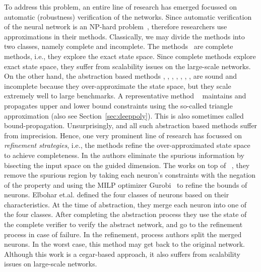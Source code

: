 To address this problem, an entire line of research has emerged focussed on automatic (robustness) verification of the networks. Since automatic verification of the neural network is an NP-hard problem~\cite{?}, therefore researchers use approximations in their methods. Classically, we may divide the methods into two classes, namely complete and incomplete. The methods~\cite{lomuscio2017approach,fischetti2018deep,dutta2018output,cheng2017maximum,katz2017reluplex,katz2019marabou,ehlers2017formal,huang2017safety,wang2021beta,xu2020fast,zhang2022general} are complete methods, i.e., they explore the exact state space. Since complete methods explore exact state space, they suffer from scalability issues on the large-scale networks. On the other hand, the abstraction based methods \cite{dvijotham2018dual}, \cite{gehr2018ai2}, \cite{singh2018fast},  \cite{singh2018boosting}, \cite{weng2018towards}, \cite{wong2018provable}, \cite{zhang2018efficient}, \cite{zhang2018efficient} are sound and incomplete because they over-approximate the state space, but they scale extremely well to large benchmarks. A representative method \deeppoly{}~\cite{singh2019abstract} maintains and propagates upper and lower bound constraints using the so-called triangle approximation (also see Section~\ref{sec:deeppoly}). This is also sometimes called bound-propagation. %
Unsurprisingly, \deeppoly{} and all such abstraction based methods suffer from imprecision. Hence, one very prominent line of research has focussed on \emph{refinement strategies}, i.e., the methods \cite{wang2018formal,wang2018efficient,elboher2020abstraction,yang2021improving,lin2020art} refine the over-approximated state space to achieve completeness. In \cite{wang2018formal,wang2018efficient,lin2020art} the authors eliminate the spurious information by bisecting the input space on the guided dimension. The \cite{yang2021improving} works on top of \deeppoly{}~\cite{singh2019abstract}, they remove the spurious region by taking each neuron's constraints with the negation of the property and using the MILP optimizer Gurobi~\cite{gurobioptimizer} to refine the bounds of neurons. Elbohar et.al. \cite{elboher2020abstraction} defined the four classes of neurons based on their characteristics. At the time of abstraction, they merge each neuron into one of the four classes.  After completing the abstraction process they use the state of the complete verifier to verify  the abstract network, and go to the refinement process in case of failure.   In the refinement, process authors split the merged neurons.  In the worst case, this method may get back to the original network.  Although this work is a cegar-based approach, it also suffers from scalability issues on large-scale networks. %


